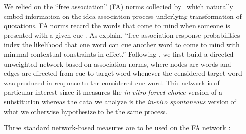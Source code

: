 \medskip
We relied on the ``free association'' (FA) norms collected by~\citet{Nelson04} which naturally embed information on the idea association process underlying transformation of quotations. FA norms record the words that come to mind when someone is presented with a given cue%
. As \citet{Nelson04} explain, ``free association response probabilities index the likelihood that one word can cue another word to come to mind with minimal contextual constraints in effect.''
Following \citet{Griffiths07}, we first build a directed unweighted network based on association norms, where nodes are words and edges are directed from cue to target word whenever the considered target word was produced in response to the considered cue word.
This network is of particular interest since it measures the \emph{in-vitro forced-choice} version of a substitution whereas the data we analyze is the \emph{in-vivo spontaneous} version of what we otherwise hypothesize to be the same process.

Three standard network-based measures are to be used on the FA network%
:

